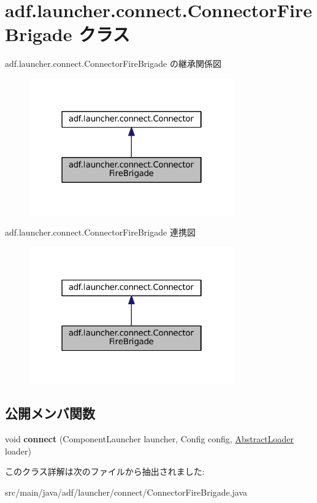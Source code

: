 \hypertarget{classadf_1_1launcher_1_1connect_1_1ConnectorFireBrigade}{}\section{adf.\+launcher.\+connect.\+Connector\+Fire\+Brigade クラス}
\label{classadf_1_1launcher_1_1connect_1_1ConnectorFireBrigade}


adf.\+launcher.\+connect.\+Connector\+Fire\+Brigade の継承関係図
\nopagebreak
\begin{figure}[H]
\begin{center}
\leavevmode
\includegraphics[width=250pt]{classadf_1_1launcher_1_1connect_1_1ConnectorFireBrigade__inherit__graph}
\end{center}
\end{figure}


adf.\+launcher.\+connect.\+Connector\+Fire\+Brigade 連携図
\nopagebreak
\begin{figure}[H]
\begin{center}
\leavevmode
\includegraphics[width=250pt]{classadf_1_1launcher_1_1connect_1_1ConnectorFireBrigade__coll__graph}
\end{center}
\end{figure}
\subsection*{公開メンバ関数}
\begin{DoxyCompactItemize}
\item 
\hypertarget{classadf_1_1launcher_1_1connect_1_1ConnectorFireBrigade_ae430ca086d1713107280806dd69656cb}{}\label{classadf_1_1launcher_1_1connect_1_1ConnectorFireBrigade_ae430ca086d1713107280806dd69656cb} 
void {\bfseries connect} (Component\+Launcher launcher, Config config, \hyperlink{classadf_1_1component_1_1AbstractLoader}{Abstract\+Loader} loader)
\end{DoxyCompactItemize}


このクラス詳解は次のファイルから抽出されました\+:\begin{DoxyCompactItemize}
\item 
src/main/java/adf/launcher/connect/Connector\+Fire\+Brigade.\+java\end{DoxyCompactItemize}
